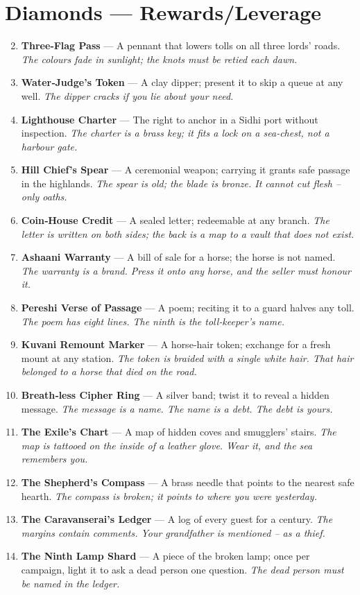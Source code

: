 \documentclass[11pt]{book}
\begin{document}
\section*{Diamonds — Rewards/Leverage}
\begin{enumerate}
\setcounter{enumi}{1}
\item \textbf{Three‑Flag Pass} — A pennant that lowers tolls on all three lords’ roads. \textit{The colours fade in sunlight; the knots must be retied each dawn.}
\item \textbf{Water‑Judge’s Token} — A clay dipper; present it to skip a queue at any well. \textit{The dipper cracks if you lie about your need.}
\item \textbf{Lighthouse Charter} — The right to anchor in a Sidhi port without inspection. \textit{The charter is a brass key; it fits a lock on a sea‑chest, not a harbour gate.}
\item \textbf{Hill Chief’s Spear} — A ceremonial weapon; carrying it grants safe passage in the highlands. \textit{The spear is old; the blade is bronze. It cannot cut flesh – only oaths.}
\item \textbf{Coin‑House Credit} — A sealed letter; redeemable at any branch. \textit{The letter is written on both sides; the back is a map to a vault that does not exist.}
\item \textbf{Ashaani Warranty} — A bill of sale for a horse; the horse is not named. \textit{The warranty is a brand. Press it onto any horse, and the seller must honour it.}
\item \textbf{Pereshi Verse of Passage} — A poem; reciting it to a guard halves any toll. \textit{The poem has eight lines. The ninth is the toll‑keeper’s name.}
\item \textbf{Kuvani Remount Marker} — A horse‑hair token; exchange for a fresh mount at any station. \textit{The token is braided with a single white hair. That hair belonged to a horse that died on the road.}
\item \textbf{Breath‑less Cipher Ring} — A silver band; twist it to reveal a hidden message. \textit{The message is a name. The name is a debt. The debt is yours.}
\item[J] \textbf{The Exile’s Chart} — A map of hidden coves and smugglers’ stairs. \textit{The map is tattooed on the inside of a leather glove. Wear it, and the sea remembers you.}
\item[Q] \textbf{The Shepherd’s Compass} — A brass needle that points to the nearest safe hearth. \textit{The compass is broken; it points to where you were yesterday.}
\item[K] \textbf{The Caravanserai’s Ledger} — A log of every guest for a century. \textit{The margins contain comments. Your grandfather is mentioned – as a thief.}
\item[A] \textbf{The Ninth Lamp Shard} — A piece of the broken lamp; once per campaign, light it to ask a dead person one question. \textit{The dead person must be named in the ledger.}
\end{enumerate}
\end{document}
